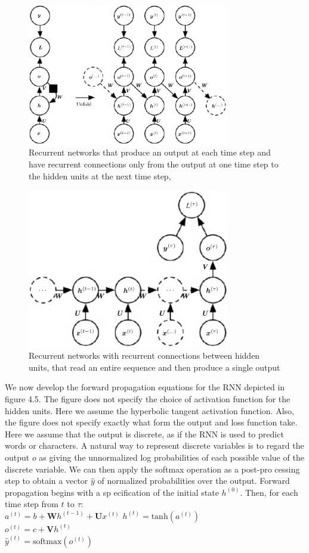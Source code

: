 \documentclass{report}
\begin{document}
\begin{figure}[ht]
	\includegraphics[width=250pt]{37}
	\centering
	\caption{Recurrent networks that produce an output at each time step and have recurrent connections only from the output at one time step to the hidden units at the next time step,}
\end{figure}

\begin{figure}[ht]
	\includegraphics[width=250pt]{38}
	\centering
	\caption{Recurrent networks with recurrent connections between hidden units, that read an entire sequence and then produce a single output}
\end{figure}

We now develop the forward propagation equations for the RNN depicted in figure 4.5. The figure does not specify the choice of activation function for the hidden units. Here we assume the hyperbolic tangent activation function. Also, the figure does not specify exactly what form the output and loss function take. Here we assume that the output is discrete, as if the RNN is used to predict words or characters. A natural way to represent discrete variables is to regard the output $o$ as giving the unnormalized log probabilities of each possible value of the discrete variable. We can then apply the softmax operation as a post-pro cessing step to obtain a vector $\hat{y}$ of normalized probabilities over the output. Forward propagation begins with a sp ecification of the initial state $h^{(0)}$. Then, for each time step from $t$ to $\tau$:
\\
$a^{(t)} = b + \mathbf{W}h^{(t-1)} + \mathbf{U}x^{(t)}$
$h^{(t)} = \text{tanh}(a^{(t)})$ \\
$o^{(t)} = c + \mathbf{V}h^{(t)}$ \\
$\hat{y}^{(t)} = \text{softmax}(o^{(t)})$
 
\end{document}
